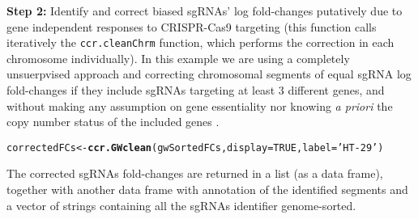 \documentclass{article}\usepackage[]{graphicx}\usepackage[]{color}
\makeatletter
\newcommand{\hlnum}[1]{\textcolor[rgb]{0.686,0.059,0.569}{#1}}%
\newcommand{\hlstr}[1]{\textcolor[rgb]{0.192,0.494,0.8}{#1}}%
\newcommand{\hlstd}[1]{\textcolor[rgb]{0.345,0.345,0.345}{#1}}%
\newcommand{\hlkwb}[1]{\textcolor[rgb]{0.69,0.353,0.396}{#1}}%
\newcommand{\hlkwc}[1]{\textcolor[rgb]{0.333,0.667,0.333}{#1}}%
\newcommand{\hlkwd}[1]{\textcolor[rgb]{0.737,0.353,0.396}{\textbf{#1}}}%
\newenvironment{kframe}{%
 \def\at@end@of@kframe{}%
 \ifinner\ifhmode%
  \def\at@end@of@kframe{\end{minipage}}%
  \begin{minipage}{\columnwidth}%
 \fi\fi%
 \def\FrameCommand##1{\hskip\@totalleftmargin \hskip-\fboxsep
 \colorbox{shadecolor}{##1}\hskip-\fboxsep
     \hskip-\linewidth \hskip-\@totalleftmargin \hskip\columnwidth}%
 \MakeFramed {\advance\hsize-\width
   \@totalleftmargin\z@ \linewidth\hsize
   \@setminipage}}%
 {\par\unskip\endMakeFramed%
 \at@end@of@kframe}
\newenvironment{knitrout}{}{} %
\makeatother
\begin{document}
\textbf{Step 2:} Identify and correct biased sgRNAs' log fold-changes putatively due to gene independent responses to CRISPR-Cas9 targeting (this function calls iteratively the \texttt{ccr.cleanChrm} function,
which performs the correction in each chromosome individually). In this example we are using a completely unsuerpvised approach and correcting chromosomal segments of equal sgRNA log fold-changes if they include sgRNAs targeting at least 3 different genes, and without making any assumption on gene essentiality nor knowing \textit{a priori} the copy number status of the included genes \cite{Iorio:2017}.

\begin{knitrout}
\color{fgcolor}\begin{kframe}
\begin{alltt}
\hlstd{correctedFCs}\hlkwb{<-}\hlkwd{ccr.GWclean}\hlstd{(gwSortedFCs,}\hlkwc{display}\hlstd{=}\hlnum{TRUE}\hlstd{,}\hlkwc{label}\hlstd{=}\hlstr{'HT-29'}\hlstd{)}
\end{alltt}
\end{kframe}
\end{knitrout}
The corrected sgRNAs fold-changes are returned in a list (as a data frame), together with another data frame
with annotation of the identified segments and a vector of strings containing all the sgRNAs identifier genome-sorted.
\end{document}
